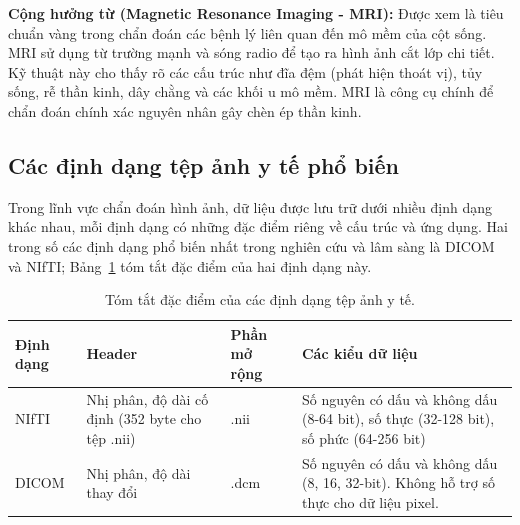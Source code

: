  \textbf{Cộng hưởng từ (Magnetic Resonance Imaging - MRI):} Được xem là tiêu chuẩn vàng trong chẩn đoán các bệnh lý liên quan đến mô mềm của cột sống. MRI sử dụng từ trường mạnh và sóng radio để tạo ra hình ảnh cắt lớp chi tiết. Kỹ thuật này cho thấy rõ các cấu trúc như đĩa đệm (phát hiện thoát vị), tủy sống, rễ thần kinh, dây chằng và các khối u mô mềm. MRI là công cụ chính để chẩn đoán chính xác nguyên nhân gây chèn ép thần kinh.

\subsection{Các định dạng tệp ảnh y tế phổ biến}
Trong lĩnh vực chẩn đoán hình ảnh, dữ liệu được lưu trữ dưới nhiều định dạng khác nhau, mỗi định dạng có những đặc điểm riêng về cấu trúc và ứng dụng. Hai trong số các định dạng phổ biến nhất trong nghiên cứu và lâm sàng là DICOM và NIfTI; Bảng~\ref{tab:file_formats} tóm tắt đặc điểm của hai định dạng này.

\begin{table}[h!]
\centering
\caption{Tóm tắt đặc điểm của các định dạng tệp ảnh y tế.}
\label{tab:file_formats}
\begin{tabular}{|l|p{4cm}|l|p{5cm}|}
\hline
\textbf{Định dạng} & \textbf{Header} & \textbf{Phần mở rộng} & \textbf{Các kiểu dữ liệu} \\ \hline
NIfTI & Nhị phân, độ dài cố định (352 byte cho tệp .nii) & .nii & Số nguyên có dấu và không dấu (8-64 bit), số thực (32-128 bit), số phức (64-256 bit) \\ \hline
DICOM & Nhị phân, độ dài thay đổi & .dcm & Số nguyên có dấu và không dấu (8, 16, 32-bit). Không hỗ trợ số thực cho dữ liệu pixel. \\ \hline
\end{tabular}
\end{table}

